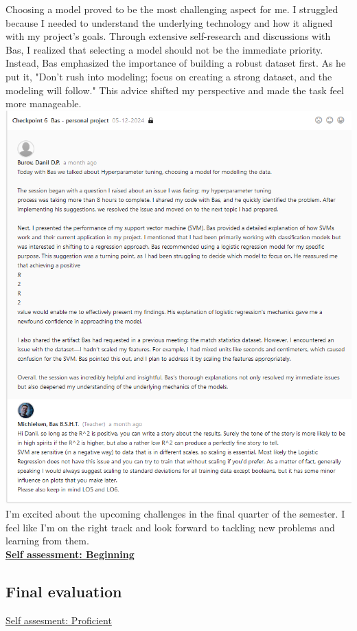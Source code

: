 \documentclass{article}
\begin{document}
	Choosing a model proved to be the most challenging aspect for me. I struggled because I needed to understand the underlying technology and how it aligned with my project’s goals. Through extensive self-research and discussions with Bas, I realized that selecting a model should not be the immediate priority. Instead, Bas emphasized the importance of building a robust dataset first. As he put it, "Don’t rush into modeling; focus on creating a strong dataset, and the modeling will follow." This advice shifted my perspective and made the task feel more manageable.\\
	  \includegraphics[width=\textwidth]{images/Feedback_Bas_2.png}\\
	
	I’m excited about the upcoming challenges in the final quarter of the semester. I feel like I’m on the right track and look forward to tackling new problems and learning from them.\\
	  \underline{\textbf{Self assessment: Beginning}}
	\subsection{Final evaluation} %
	\underline{Self assesment: Proficient}
\end{document}
